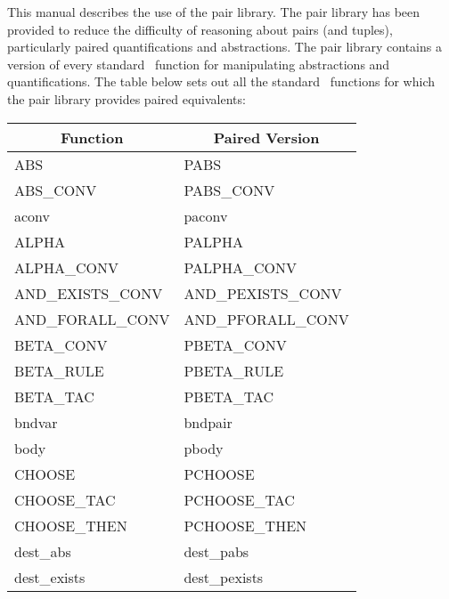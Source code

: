 This manual describes the use of the pair library.
The pair library has been provided to reduce the difficulty of reasoning
about pairs (and tuples), particularly paired quantifications and abstractions.
The pair library contains a version of every standard \HOL\ function
for manipulating abstractions and quantifications.
The table below sets out all the standard \HOL\ functions for which the
pair library provides paired equivalents:
{\tiny \begin{center}
    \begin{tabular}[t]{|l|l|}                                           \hline
        \multicolumn{1}{|c|}{\normalsize Function}
    &   \multicolumn{1}{|c|}{\normalsize Paired Version}\\              \hline
        ABS                         &   PABS                        \\
        ABS\_CONV                   &   PABS\_CONV                  \\
        aconv                       &   paconv                      \\
        ALPHA                       &   PALPHA                      \\
        ALPHA\_CONV                 &   PALPHA\_CONV                \\
        AND\_EXISTS\_CONV           &   AND\_PEXISTS\_CONV          \\
        AND\_FORALL\_CONV           &   AND\_PFORALL\_CONV          \\
        BETA\_CONV                  &   PBETA\_CONV                 \\
        BETA\_RULE                  &   PBETA\_RULE                 \\
        BETA\_TAC                   &   PBETA\_TAC                  \\
        bndvar                      &   bndpair                     \\
        body                        &   pbody                       \\
        CHOOSE                      &   PCHOOSE                     \\
        CHOOSE\_TAC                 &   PCHOOSE\_TAC                \\
        CHOOSE\_THEN                &   PCHOOSE\_THEN               \\
        dest\_abs                   &   dest\_pabs                  \\
        dest\_exists                &   dest\_pexists               \\

\end{tabular}
\end{center}}
